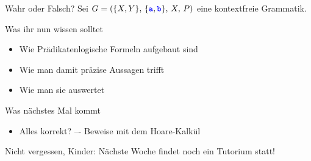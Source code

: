 \begin{frame}[t]{Wahr oder Falsch?}
	\Socrative
	Sei $G=(\{X,Y\},\, \{\hbox{\textcolor{blue}{\texttt{a}}}, \hbox{\textcolor{blue}{\texttt{b}}}\},\, X,\, P)$ eine kontextfreie Grammatik. \\
\end{frame}





\begin{frame}	
	\begin{block}{Was ihr nun wissen solltet}
		\begin{itemize}
			\item Wie Prädikatenlogische Formeln aufgebaut sind
			\item Wie man damit präzise Aussagen trifft
			\item Wie man sie auswertet
		\end{itemize}
	\end{block}
	
	\begin{block}{Was nächstes Mal kommt}
		\begin{itemize}
			\item Alles korrekt? –- Beweise mit dem Hoare-Kalkül
		\end{itemize}
	\end{block}
\end{frame}

\begin{frame}[plain]
	\begin{center}
		\large
		Nicht vergessen, Kinder: Nächste Woche findet noch ein Tutorium statt! \smiley
	\end{center}
\end{frame}

\slideThanks

